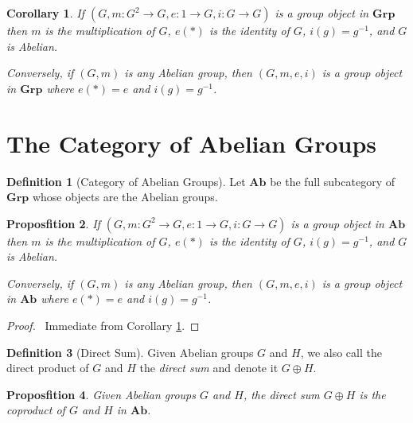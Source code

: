 \documentclass{book}
\let\qed\relax
\newtheorem{prop}{Proposfition}[chapter]
\newtheorem{cor}{Corollary}[prop]
\theoremstyle{definition}
\newtheorem{df}[prop]{Definition}
\newcommand{\Ab}{\ensuremath{\mathbf{Ab}}}
\newcommand{\Grp}{\ensuremath{\mathbf{Grp}}}
\newcommand{\inv}[1]{\ensuremath{{#1}^{-1}}}
\begin{document}
\begin{cor}
\label{cor:group-in-group}
If $(G, m : G^2 \rightarrow G, e : 1 \rightarrow G, i : G \rightarrow G)$ is a group object in $\Grp$ then $m$ is the multiplication of $G$, $e(*)$ is the identity of $G$, $i(g) = \inv{g}$, and $G$ is Abelian.

Conversely, if $(G, m)$ is any Abelian group, then $(G,m,e,i)$ is a group object in $\Grp$ where $e(*) = e$ and $i(g) = \inv{g}$.
\end{cor}

\section{The Category of Abelian Groups}

\begin{df}[Category of Abelian Groups]
    Let $\Ab$ be the full subcategory of $\mathbf{Grp}$ whose objects are the Abelian groups.
\end{df}

\begin{prop}
If $(G, m : G^2 \rightarrow G, e : 1 \rightarrow G, i : G \rightarrow G)$ is a group object in $\Ab$ then $m$ is the multiplication of $G$, $e(*)$ is the identity of $G$, $i(g) = \inv{g}$, and $G$ is Abelian.

Conversely, if $(G, m)$ is any Abelian group, then $(G,m,e,i)$ is a group object in $\Ab$ where $e(*) = e$ and $i(g) = \inv{g}$.
\end{prop}

\begin{proof}
\pf\ Immediate from Corollary \ref{cor:group-in-group}. \qed
\end{proof}

\begin{df}[Direct Sum]
    Given Abelian groups $G$ and $H$, we also call the direct product of $G$ and $H$ the \emph{direct sum} and denote it $G \oplus H$.
\end{df}

\begin{prop}
    Given Abelian groups $G$ and $H$, the direct sum $G \oplus H$ is the coproduct of $G$ and $H$ in $\Ab$.
\end{prop}
\end{document}
